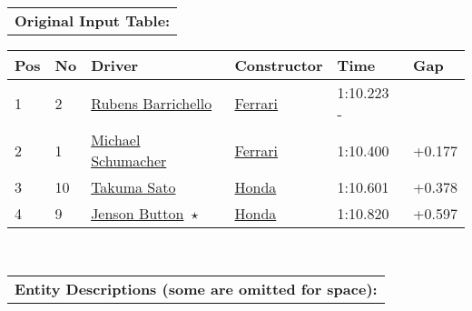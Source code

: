 \documentclass[11pt]{article}
\begin{document}
\begin{figure*}[th]
\begin{tabular}{p{14cm}}
\textbf{Original Input Table:} \\
\end{tabular}
\centering
\small
\begin{tabular}{llllll}
\textbf{Pos} &	\textbf{No} & \textbf{Driver} & \textbf{Constructor} & \textbf{Time} & \textbf{Gap} \\
\hline
1	&2	&\underline{Rubens Barrichello}	&\underline{Ferrari} 	&1:10.223	- \\
2	&1	&\underline{Michael Schumacher}	&\underline{Ferrari}	&1:10.400	&+0.177 \\
3	&10	&\underline{Takuma Sato}	&\underline{Honda}	&1:10.601	&+0.378 \\
4	&9	&\underline{Jenson Button}~$\star$	&\underline{Honda}	&1:10.820	&+0.597 \\
\end{tabular}\\
\vspace{6pt}
\begin{tabular}{p{14cm}}
\textbf{Entity Descriptions (some are omitted for space):} \\


\end{tabular}
\end{figure*}
\end{document}
